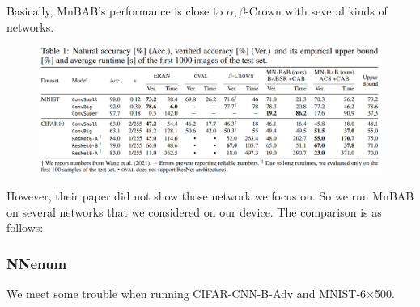 Basically, MnBAB's performance is close to $\alpha,\beta$-Crown with several kinds of networks. 
\begin{figure}[h]
	\includegraphics[scale=0.32]{ToMNBAB.png}
\end{figure}
However, their paper did not show those network we focus on. So we run MnBAB on several networks that we considered on our device. The comparison is as follows:







\subsubsection*{NNenum} 

We meet some trouble when running CIFAR-CNN-B-Adv and MNIST-6$\times$500.

